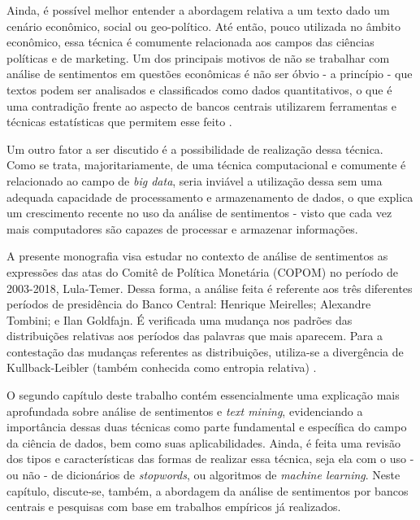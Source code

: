 Ainda, é possível melhor entender a abordagem relativa a um texto dado um cenário econômico, social ou geo-político. Até então, pouco utilizada no âmbito econômico, essa técnica é comumente relacionada aos campos das ciências políticas e de marketing. Um dos principais motivos de não se trabalhar com análise de sentimentos em questões econômicas é não ser óbvio - a princípio - que textos podem ser analisados e classificados como dados quantitativos, o que é uma contradição frente ao aspecto de bancos centrais utilizarem ferramentas e técnicas estatísticas que permitem esse feito \cite{bholat2015text}.        

Um outro fator a ser discutido é a possibilidade de realização dessa técnica. Como se trata, majoritariamente, de uma técnica computacional e comumente é relacionado ao campo de \textit{big data}, seria inviável a utilização dessa sem uma adequada capacidade de processamento e armazenamento de dados, o que explica um crescimento recente no uso da análise de sentimentos - visto que cada vez mais computadores são capazes de processar e armazenar informações.  

A presente monografia visa estudar no contexto de análise de sentimentos as expressões das atas do Comitê de Política Monetária (COPOM) no período de 2003-2018, Lula-Temer. Dessa forma, a análise feita é referente aos três diferentes períodos de presidência do Banco Central: Henrique Meirelles; Alexandre Tombini; e Ilan Goldfajn. É verificada uma mudança nos padrões das distribuições relativas aos períodos das palavras que mais aparecem. Para a contestação das mudanças referentes as distribuições, utiliza-se a divergência de Kullback-Leibler (também conhecida como entropia relativa) \cite{kullback1951information}. %

O segundo capítulo deste trabalho contém essencialmente uma explicação mais aprofundada sobre análise de sentimentos e \textit{text mining}, evidenciando a importância dessas duas técnicas como parte fundamental e específica do campo da ciência de dados, bem como suas aplicabilidades. Ainda, é feita uma revisão dos tipos e características das formas de realizar essa técnica, seja ela com o uso - ou não - de dicionários de \textit{stopwords}, ou algoritmos de \textit{machine learning}. Neste capítulo, discute-se, também, a abordagem da análise de sentimentos por bancos centrais e pesquisas com base em trabalhos empíricos já realizados.

